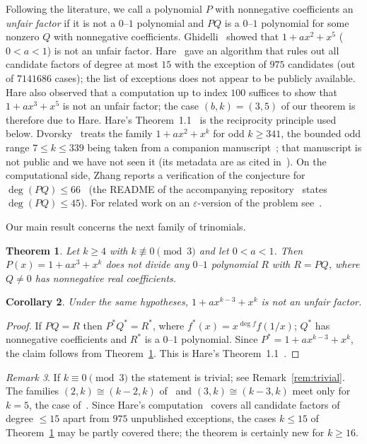 \documentclass[11pt]{amsart}
\newtheorem{theorem}{Theorem}[section]
\newtheorem{corollary}[theorem]{Corollary}
\theoremstyle{definition}
\theoremstyle{remark}
\newtheorem{remark}[theorem]{Remark}
\begin{document}
Following the literature, we call a polynomial $P$ with nonnegative coefficients
an \emph{unfair factor} if it is not a $0$--$1$ polynomial and $PQ$ is a $0$--$1$
polynomial for some nonzero $Q$ with nonnegative coefficients. Ghidelli~\cite{Ghidelli2022}
showed that $1+ax^2+x^5$ ($0<a<1$) is not an unfair factor. Hare~\cite{Hare2023}
gave an algorithm that rules out all candidate factors of degree at most $15$
with the exception of $975$ candidates (out of $7141686$ cases); the list of exceptions
does not appear to be publicly available. Hare also observed that a
computation up to index $100$ suffices to show that $1+ax^3+x^5$ is not an unfair
factor; the case $(b,k)=(3,5)$ of our theorem is therefore due to Hare. Hare's
Theorem~1.1~\cite{Hare2023} is the reciprocity principle used below.
Dvorsky~\cite{Dvorsky2026} treats the family $1+ax^2+x^k$ for odd $k\ge 341$,
the bounded odd range $7\le k\le 339$ being taken from a companion
manuscript~\cite{DvorskyCompanion}; that manuscript is not public and we have not seen
it (its metadata are as cited in~\cite{Dvorsky2026}). On the computational side, Zhang reports a verification
of the conjecture for $\deg(PQ)\le 66$~\cite{ZhangMO} (the README of the accompanying
repository~\cite{ZhangGitHub} states $\deg(PQ)\le 45$). For related work on an
$\varepsilon$-version of the problem see~\cite{NguyenPhamPham2026}.

Our main result concerns the next family of trinomials.

\begin{theorem}\label{thm:main}
Let $k\ge 4$ with $k\not\equiv 0\pmod 3$ and let $0<a<1$. Then
$P(x)=1+ax^3+x^k$ does not divide any $0$--$1$ polynomial $R$ with $R=PQ$, where
$Q\neq 0$ has nonnegative real coefficients.
\end{theorem}

\begin{corollary}\label{cor:recip}
Under the same hypotheses, $1+ax^{k-3}+x^k$ is not an unfair factor.
\end{corollary}

\begin{proof}
If $PQ=R$ then $P^*Q^*=R^*$, where $f^*(x)=x^{\deg f}f(1/x)$; $Q^*$ has
nonnegative coefficients and $R^*$ is a $0$--$1$ polynomial. Since
$P^*=1+ax^{k-3}+x^k$, the claim follows from Theorem~\ref{thm:main}. This is
Hare's Theorem~1.1~\cite{Hare2023}.
\end{proof}

\begin{remark}
If $k\equiv 0\pmod 3$ the statement is trivial; see Remark~\ref{rem:trivial}.
The families $(2,k)\cong(k-2,k)$ of~\cite{Dvorsky2026} and $(3,k)\cong(k-3,k)$
meet only for $k=5$, the case of~\cite{Ghidelli2022}. Since Hare's
computation~\cite{Hare2023} covers all candidate factors of degree $\le 15$ apart
from $975$ unpublished exceptions, the cases $k\le 15$ of Theorem~\ref{thm:main} may
be partly covered there; the theorem is certainly new for $k\ge 16$.
\end{remark}
\end{document}
